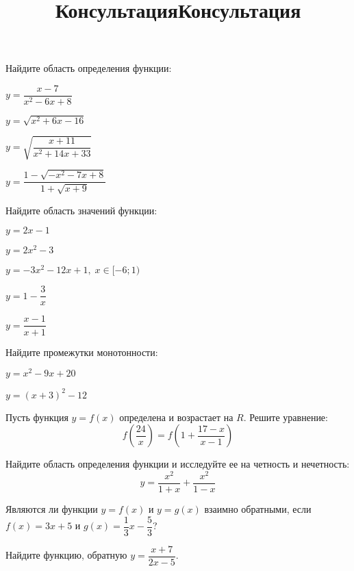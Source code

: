 \newpage
\title{Консультация}
\begin{listofex}
	\item Найдите область определения функции:
	\begin{enumcols}[itemcolumns=2]
		\item \( y=\dfrac{x-7}{x^2-6x+8} \)
		\item \( y=\sqrt{x^2+6x-16} \)
		\item \( y=\sqrt{\dfrac{x+11}{x^2+14x+33}} \)
		\item \( y=\dfrac{1-\sqrt{-x^2-7x+8}}{1+\sqrt{x+9}} \)
	\end{enumcols}
	\item Найдите область значений функции:
	\begin{enumcols}[itemcolumns=2]
		\item \( y=2x-1 \)
		\item \( y=2x^2-3 \)
		\item \( y=-3x^2-12x+1,\;x\in[-6;1) \)
		\item \( y=1-\dfrac{3}{x} \)
		\item \( y=\dfrac{x-1}{x+1} \)
	\end{enumcols}
	\item Найдите промежутки монотонности:
	\begin{enumcols}[itemcolumns=2]
		\item \( y=x^2-9x+20 \)
		\item \( y=(x+3)^2-12 \)
	\end{enumcols}
	\item Пусть функция \( y=f(x) \) определена и возрастает на \( R \). Решите уравнение: \[ f\left( \dfrac{24}{x} \right)=f\left( 1+\dfrac{17-x}{x-1} \right) \]
	\item Найдите область определения функции и исследуйте ее на четность и нечетность: \[ y=\dfrac{x^2}{1+x}+\dfrac{x^2}{1-x} \]
	\item Являются ли функции \( y=f(x) \) и \( y=g(x) \) взаимно обратными, если \( f(x)=3x+5 \) и \( g(x)=\dfrac{1}{3}x-\dfrac{5}{3} \)?
	\item Найдите функцию, обратную \( y=\dfrac{x+7}{2x-5} \).
\end{listofex}
\newpage
\title{Консультация}
